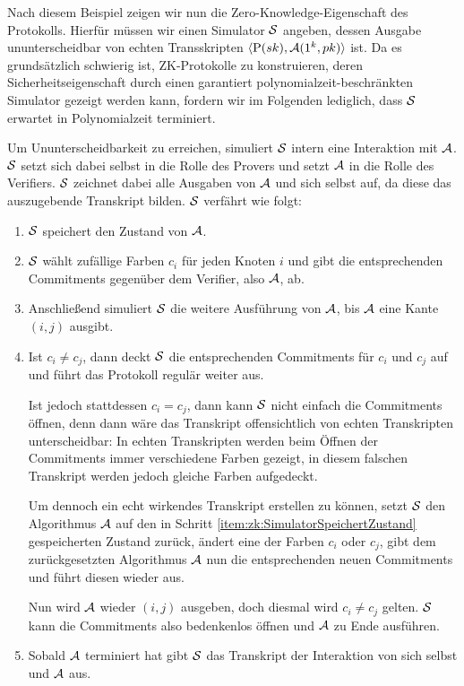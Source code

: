Nach diesem Beispiel zeigen wir nun die Zero-Knowledge-Eigenschaft des Protokolls.
Hierfür müssen wir einen Simulator $\mathcal{S}$ angeben, dessen Ausgabe ununterscheidbar von echten Transskripten $\langle \mathrm{P}(sk), \mathcal{A}(1^k, pk) \rangle$ ist.
Da es grundsätzlich schwierig ist, ZK-Protokolle zu konstruieren, deren Sicherheitseigenschaft durch einen garantiert poly\-nomialzeit-be\-schränk\-ten Simulator gezeigt werden kann,
fordern wir im Folgenden lediglich, dass $\mathcal{S}$ erwartet in Polynomialzeit terminiert.

Um Ununterscheidbarkeit zu erreichen, simuliert $\mathcal{S}$ intern eine Interaktion mit $\mathcal{A}$. $\mathcal{S}$ setzt sich dabei selbst in die Rolle des Provers und setzt $\mathcal{A}$ in die Rolle des Verifiers. $\mathcal{S}$ zeichnet dabei alle Ausgaben von $\mathcal{A}$ und sich selbst auf, da diese das auszugebende Transkript bilden.
$\mathcal{S}$ verfährt wie folgt:
\begin{enumerate}
	\item \label{item:zk:SimulatorSpeichertZustand}
	$\mathcal{S}$ speichert den Zustand von $\mathcal{A}$.
	\item $\mathcal{S}$ wählt zufällige Farben $c_i$ für jeden Knoten $i$ und gibt die entsprechenden Commitments gegenüber dem Verifier, also $\mathcal{A}$, ab.
	\item Anschließend simuliert $\mathcal{S}$ die weitere Ausführung von $\mathcal{A}$, bis $\mathcal{A}$ eine Kante $(i,j)$ ausgibt.
	
	\item Ist $c_i \neq c_j$, dann deckt $\mathcal{S}$ die entsprechenden Commitments für $c_i$ und $c_j$ auf und führt das Protokoll regulär weiter aus.
	
		Ist jedoch stattdessen $c_i = c_j$, dann kann $\mathcal{S}$ nicht einfach die Commitments öffnen, denn dann wäre das Transkript offensichtlich von echten Transkripten unterscheidbar: In echten Transkripten werden beim Öffnen der Commitments immer verschiedene Farben gezeigt, in diesem falschen Transkript werden jedoch gleiche Farben aufgedeckt.
		
		Um dennoch ein echt wirkendes Transkript erstellen zu können, setzt $\mathcal{S}$ den Algorithmus $\mathcal{A}$ auf den in Schritt \ref{item:zk:SimulatorSpeichertZustand} gespeicherten Zustand zurück, ändert eine der Farben $c_i$ oder $c_j$, gibt dem zurückgesetzten Algorithmus $\mathcal{A}$ nun die entsprechenden neuen Commitments und führt diesen wieder aus.
		
		Nun wird $\mathcal{A}$ wieder $(i,j)$ ausgeben, doch diesmal wird $c_i \neq c_j$ gelten. $\mathcal{S}$ kann die Commitments also bedenkenlos öffnen und $\mathcal{A}$ zu Ende ausführen.

			\item Sobald $\mathcal{A}$ terminiert hat gibt $\mathcal{S}$ das Transkript der Interaktion von sich selbst und $\mathcal{A}$ aus.
\end{enumerate}

